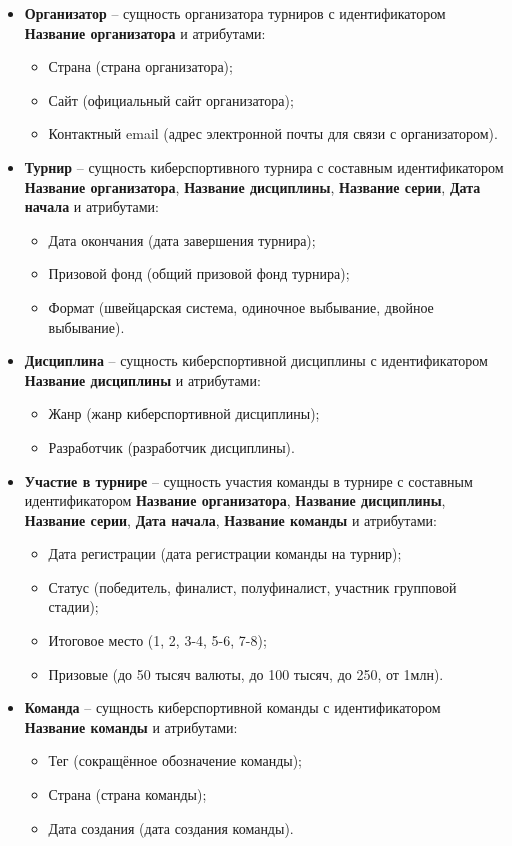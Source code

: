 \documentclass[a4paper, 14pt]{extarticle}
\begin{document}
\begin{itemize}
  \item \textbf{Организатор} -- сущность организатора турниров с идентификатором \textbf{Название организатора} и атрибутами:
  \begin{itemize}
    \item Страна (страна организатора);
    \item Сайт (официальный сайт организатора);
    \item Контактный email (адрес электронной почты для связи с организатором).
  \end{itemize}

  \item \textbf{Турнир} -- сущность киберспортивного турнира с составным идентификатором \textbf{Название организатора}, \textbf{Название дисциплины}, \textbf{Название серии}, \textbf{Дата начала} и атрибутами:
  \begin{itemize}
    \item Дата окончания (дата завершения турнира);
    \item Призовой фонд (общий призовой фонд турнира);
    \item Формат (швейцарская система, одиночное выбывание, двойное выбывание).
  \end{itemize}

  \item \textbf{Дисциплина} -- сущность киберспортивной дисциплины с идентификатором \textbf{Название дисциплины} и атрибутами:
  \begin{itemize}
    \item Жанр (жанр киберспортивной дисциплины);
    \item Разработчик (разработчик дисциплины).
  \end{itemize}

  \item \textbf{Участие в турнире} -- сущность участия команды в турнире с составным идентификатором \textbf{ Название организатора}, \textbf{Название дисциплины}, \textbf{Название серии}, \textbf{Дата начала}, \textbf{Название команды} и атрибутами:
  \begin{itemize}
    \item Дата регистрации (дата регистрации команды на турнир);
    \item Статус (победитель, финалист, полуфиналист, участник групповой стадии);
    \item Итоговое место (1, 2, 3-4, 5-6, 7-8);
    \item Призовые (до 50 тысяч валюты, до 100 тысяч, до 250, от 1млн).
  \end{itemize}

  \item \textbf{Команда} -- сущность киберспортивной команды с идентификатором \textbf{Название команды} и атрибутами:
  \begin{itemize}
    \item Тег (сокращённое обозначение команды);
    \item Страна (страна команды);
    \item Дата создания (дата создания команды).
  \end{itemize}
\end{itemize}
\end{document}
